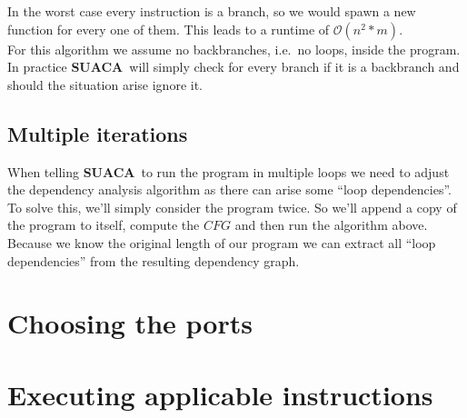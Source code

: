 \documentclass[a4paper,12pt,titlepage, twoside]{report}
\newcommand{\suaca}{\textbf{SUACA}}
\begin{document}
In the worst case every instruction is a branch, so we would spawn a new function for every one of them. This leads to a runtime of $\mathcal{O}(n^2*m)$.\\

For this algorithm we assume no backbranches, i.e.\ no loops, inside the program. In practice \suaca\ will simply check for every branch if it is a backbranch and should the situation arise ignore it.


\subsection{Multiple iterations}

When telling \suaca\ to run the program in multiple loops we need to adjust the dependency analysis algorithm as there can arise some ``loop dependencies''. To solve this, we'll simply consider the program twice. So we'll append a copy of the program to itself, compute the $CFG$ and then run the algorithm above. Because we know the original length of our program we can extract all ``loop dependencies'' from the resulting dependency graph.

\section{Choosing the ports}
\label{sec:chooseport}

\section{Executing applicable instructions}


{\small }
\end{document}
